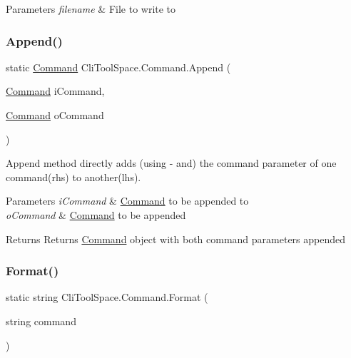 \begin{DoxyParams}{Parameters}
{\em filename} & File to write to\\
\hline
\end{DoxyParams}
\mbox{\label{class_cli_tool_space_1_1_command_a9299086e0a3a63da064734d3169d5b2f}} 
\subsubsection{\texorpdfstring{Append()}{Append()}}
{\footnotesize\ttfamily static \mbox{\hyperlink{class_cli_tool_space_1_1_command}{Command}} Cli\+Tool\+Space.\+Command.\+Append (\begin{DoxyParamCaption}\item[{\mbox{\hyperlink{class_cli_tool_space_1_1_command}{Command}}}]{i\+Command,  }\item[{\mbox{\hyperlink{class_cli_tool_space_1_1_command}{Command}}}]{o\+Command }\end{DoxyParamCaption})\hspace{0.3cm}{\ttfamily [static]}}



Append method directly adds (using -\/ and) the command parameter of one command(rhs) to another(lhs). 


\begin{DoxyParams}{Parameters}
{\em i\+Command} & \mbox{\hyperlink{class_cli_tool_space_1_1_command}{Command}} to be appended to\\
\hline
{\em o\+Command} & \mbox{\hyperlink{class_cli_tool_space_1_1_command}{Command}} to be appended\\
\hline
\end{DoxyParams}
\begin{DoxyReturn}{Returns}
Returns \mbox{\hyperlink{class_cli_tool_space_1_1_command}{Command}} object with both command parameters appended
\end{DoxyReturn}
\mbox{\label{class_cli_tool_space_1_1_command_a87f5cf560c99e6336acdb34d7f20e00a}} 
\subsubsection{\texorpdfstring{Format()}{Format()}}
{\footnotesize\ttfamily static string Cli\+Tool\+Space.\+Command.\+Format (\begin{DoxyParamCaption}\item[{string}]{command }\end{DoxyParamCaption})\hspace{0.3cm}{\ttfamily [static]}}



